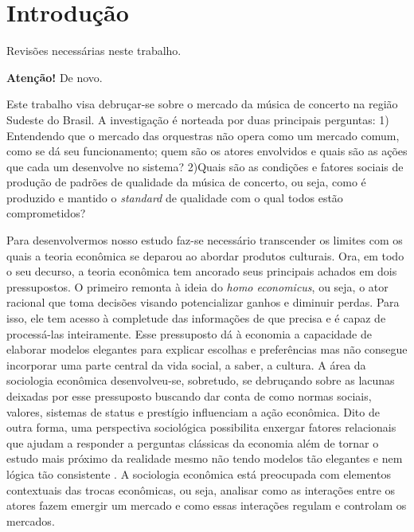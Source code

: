 \documentclass[a4paper, 12pt, openright, oneside, german, french, english, brazil, article]{abntex2}
\begin{document}
\pretextual
\imprimirfolhaderosto

\textual
\section{Introdução}

Revisões necessárias neste trabalho.

\textbf{Atenção!} De novo. 

Este trabalho visa debruçar-se sobre o mercado da música de concerto na região Sudeste do Brasil. A investigação é norteada por duas principais perguntas: 1) Entendendo que o mercado das orquestras não opera como um mercado comum, como se dá seu funcionamento; quem são os atores envolvidos e quais são as ações que cada um desenvolve no sistema? 2)Quais são as condições e fatores sociais de produção de padrões de qualidade da música de concerto, ou seja, como é produzido e mantido o \textit{standard} de qualidade com o qual todos estão comprometidos?

Para desenvolvermos nosso estudo faz-se necessário transcender os limites com os quais a teoria econômica se deparou ao abordar produtos culturais. Ora, em todo o seu decurso, a teoria econômica tem ancorado seus principais achados em dois pressupostos. O primeiro remonta à ideia do \textit{homo economicus}, ou seja, o ator racional que toma decisões visando potencializar ganhos e diminuir perdas. Para isso, ele tem acesso à completude das informações de que precisa e é capaz de processá-las inteiramente. Esse pressuposto dá à economia a capacidade de elaborar modelos elegantes para explicar escolhas e preferências mas não consegue incorporar uma parte central da vida social, a saber, a cultura. A área da sociologia econômica desenvolveu-se, sobretudo, se debruçando sobre as lacunas deixadas por esse pressuposto buscando dar conta de como normas sociais, valores, sistemas de status e prestígio influenciam a ação econômica. Dito de outra forma, uma perspectiva sociológica possibilita enxergar fatores relacionais que ajudam a responder a perguntas clássicas da economia além de tornar o estudo mais próximo da realidade mesmo não tendo modelos tão elegantes e nem lógica tão consistente \cite{hirsch1987dirty}. A sociologia econômica está preocupada com elementos contextuais das trocas econômicas, ou seja, analisar como as interações entre os atores fazem emergir um mercado e como essas interações regulam e controlam os mercados.
\end{document}
